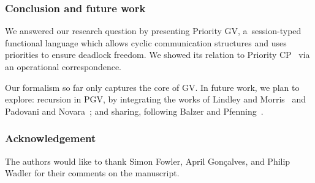 \documentclass[main.tex]{subfiles}
\begin{document}
\subsubsection*{Conclusion and future work}
We answered our research question by presenting Priority GV, a~session-typed functional language which allows cyclic communication structures and uses priorities to ensure deadlock freedom. We showed its relation to Priority CP~\cite{dardhagay18} via an operational correspondence.

Our formalism so far only captures the core of GV. In future work, we plan to explore: recursion in PGV, by integrating the works of Lindley and Morris~\cite{lindleymorris16} and Padovani and Novara~\cite{padovaninovara15}; %
and sharing, following Balzer and Pfenning~\cite{balzerpfenning17}.

\subsubsection*{Acknowledgement}
The authors would like to thank Simon Fowler, April Gon\c{c}alves, and Philip Wadler for their comments on the manuscript.
\end{document}
